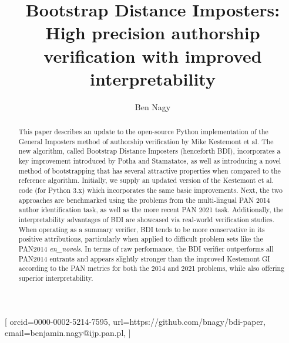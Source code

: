 \documentclass[
    hf
]{ceurart}
\begin{document}

\title{Bootstrap Distance Imposters: High precision authorship verification with improved interpretability}

\tnotemark[1]

\author[1]{Ben Nagy}[%
    orcid=0000-0002-5214-7595,
    url=https://github.com/bnagy/bdi-paper,
    email=benjamin.nagy@ijp.pan.pl,
]
\address[1]{Institute of Polish Language, Polish Academy of Sciences (IJP PAN)\\
    al. Mickiewicza 31\\
    Kraków, Poland}
\begin{abstract}
    This paper describes an update to the open-source Python implementation of the General Imposters
    method of authorship verification by Mike Kestemont et al. The new algorithm, called Bootstrap
    Distance Imposters (henceforth BDI), incorporates a key improvement introduced by Potha and
    Stamatatos, as well as introducing a novel method of bootstrapping that has several attractive
    properties when compared to the reference algorithm. Initially, we supply an updated version of
    the Kestemont et al. code (for Python 3.x) which incorporates the same basic improvements. Next,
    the two approaches are benchmarked using the problems from the multi-lingual PAN 2014 author
    identification task, as well as the more recent PAN 2021 task. Additionally, the
    interpretability advantages of BDI are showcased via real-world verification studies. When
    operating as a summary verifier, BDI tends to be more conservative in its positive attributions,
    particularly when applied to difficult problem sets like the PAN2014 \textit{en\_novels}. In
    terms of raw performance, the BDI verifier outperforms all PAN2014 entrants and appears slightly
    stronger than the improved Kestemont GI according to the PAN metrics for both the 2014 and 2021
    problems, while also offering superior interpretability.
\end{abstract}
\end{document}
